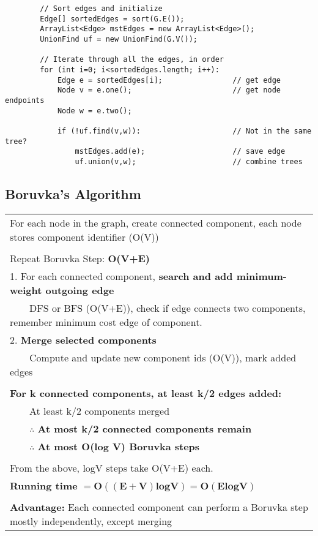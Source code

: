 \documentclass{article}
\newcommand{\tabitem}{~~\llap{\textbullet}~~}
\begin{document}
    \begin{verbatim}
        // Sort edges and initialize
        Edge[] sortedEdges = sort(G.E());
        ArrayList<Edge> mstEdges = new ArrayList<Edge>();
        UnionFind uf = new UnionFind(G.V());

        // Iterate through all the edges, in order
        for (int i=0; i<sortedEdges.length; i++):
            Edge e = sortedEdges[i];                // get edge
            Node v = e.one();                       // get node endpoints
            Node w = e.two();

            if (!uf.find(v,w)):                     // Not in the same tree?
                mstEdges.add(e);                    // save edge
                uf.union(v,w);                      // combine trees
    \end{verbatim}

    \pagebreak

    \subsection{Boruvka's Algorithm}

    \begin{tabular}{l}
        For each node in the graph, create connected component, each node stores component identifier (O(V))\\\\
        Repeat Boruvka Step: \textbf{O(V+E)} \\
        1. For each connected component, \textbf{search and add minimum-weight outgoing edge}\\
        \tabitem DFS or BFS (O(V+E)), check if edge connects two components, remember minimum cost edge of component.\\
        2. \textbf{Merge selected components}\\
        \tabitem Compute and update new component ids (O(V)), mark added edges\\\\
        \textbf{For k connected components, at least k/2 edges added: }\\
        \tabitem At least k/2 components merged\\
        \tabitem $\therefore$ \textbf{At most k/2 connected components remain}\\
        \tabitem $\therefore$ \textbf{At most O(log V) Boruvka steps}\\\\

        From the above, logV steps take O(V+E) each.\\
        \textbf{Running time} $\bm{= O((E+V)logV) = O(ElogV)}$\\\\

        \textbf{Advantage: }Each connected component can perform a Boruvka step mostly independently, except merging\\
    \end{tabular}
\end{document}
